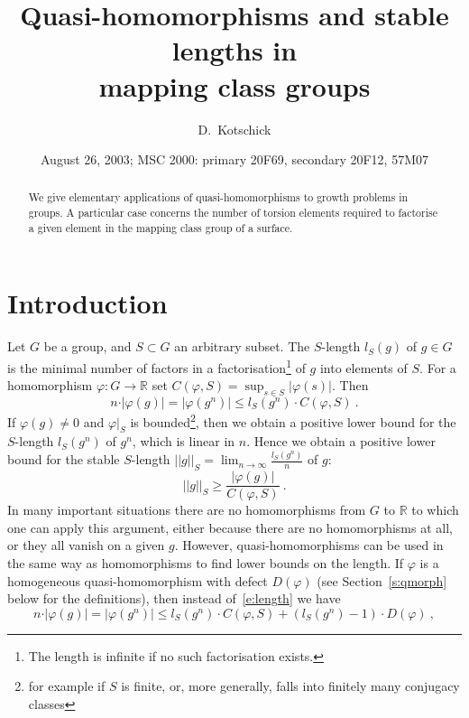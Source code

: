 \documentclass[12pt]{amsart}
\title[Quasi-homomorphisms and stable lengths in mapping class groups]{Quasi-homomorphisms and stable lengths in\\ mapping class groups}
\author{D.~Kotschick}
\date{August 26, 2003; MSC 2000: primary 20F69, secondary 20F12, 57M07}
\theoremstyle{remark}
\theoremstyle{definition}
\newcommand{\R}{\mathbb{ R}}
\begin{document}
\begin{abstract}
    We give elementary applications of quasi-homomorphisms to 
    growth problems in groups. A particular case concerns the 
    number of torsion elements required to factorise a given element 
    in the mapping class group of a surface.
\end{abstract}

\maketitle

\section{Introduction}

Let $G$ be a group, and $S\subset G$ an arbitrary subset. The 
$S$-length $l_{S}(g)$ of $g\in G$ is the minimal number of factors in 
a factorisation\footnote{The length is infinite if no such 
factorisation exists.} of $g$ into elements of $S$. For a 
homomorphism $\varphi\colon G\rightarrow\R$ set 
$C(\varphi,S)=\sup_{s\in S}\vert\varphi(s)\vert$. Then 
\begin{equation}\label{e:length}
    n\cdot\vert\varphi(g)\vert = \vert\varphi(g^{n})\vert\leq 
    l_{S}(g^{n})\cdot C(\varphi,S) \ .
    \end{equation}
If $\varphi(g)\neq 0$ and $\varphi\vert_{S}$ is bounded\footnote{for 
example if $S$ is finite, or, more generally, falls into finitely 
many conjugacy classes}, then we obtain a positive lower bound for the 
$S$-length $l_{S}(g^{n})$ of $g^{n}$, which is linear in $n$. Hence we 
obtain a positive lower bound for the stable $S$-length $\vert\vert 
g\vert\vert_{S}=\lim_{n\rightarrow\infty}\frac{l_{S}(g^{n})}{n}$ of $g$:
\begin{equation}\label{e:slength}
    \vert\vert g \vert\vert_{S}
    \geq\frac{\vert\varphi(g)\vert}{C(\varphi,S)} \ .
    \end{equation}
In many important situations there are no homomorphisms from $G$ to $\R$ 
to which one can apply this argument, either because there are no 
homomorphisms at all, or they all vanish on a given $g$. However, 
quasi-homomorphisms can be used in the same way as homomorphisms to 
find lower bounds on the length. If $\varphi$ is a homogeneous quasi-homomorphism 
with defect $D(\varphi)$ (see Section~\ref{s:qmorph} below for the 
definitions), then instead of~\eqref{e:length} we have 
\begin{equation}\label{e:qlength}
    n\cdot\vert\varphi(g)\vert = \vert\varphi(g^{n})\vert\leq 
    l_{S}(g^{n})\cdot C(\varphi,S) +(l_{S}(g^{n})-1)\cdot 
    D(\varphi)\ ,
    \end{equation}
\end{document}

